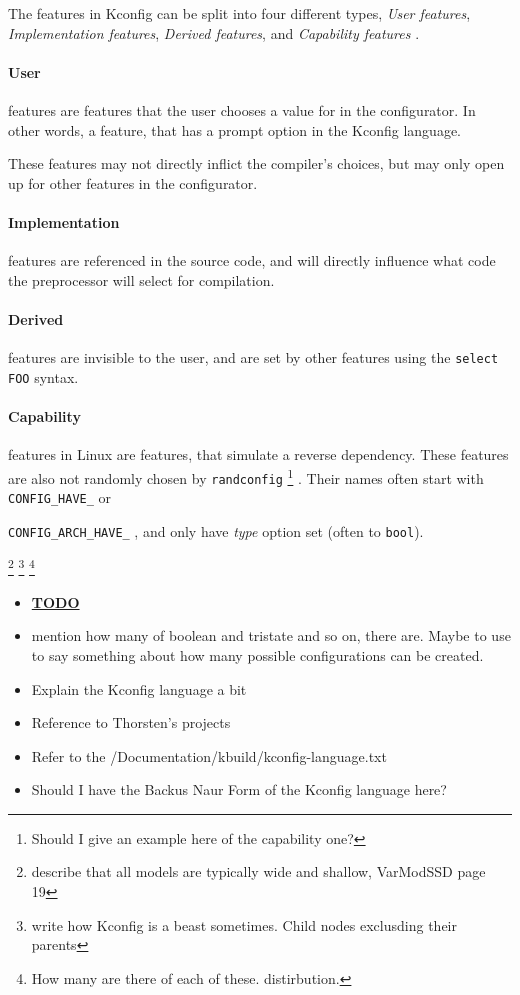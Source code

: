 \documentclass[a4paper,11pt]{report}
\newcommand{\textcode}[1]{
    \fboxsep=1pt
    \texttt{\colorbox{gray!20}{#1}}
}
\begin{document}
        {\color{gray}
The features in Kconfig can be split into four different types, \emph{User 
features}, \emph{Implementation features}, \emph{Derived features}, and 
\emph{Capability features}
    \cite[p. 8]{VarModSSD}
.
\\ 

\paragraph{User} features are features that the user chooses a value for in the 
configurator. In other words, a feature, that has a prompt option in the 
Kconfig language. 

These features may not directly inflict the compiler's choices, but may only 
open up for other features in the configurator.

\paragraph{Implementation} features are referenced in the source code, and will 
directly influence what code the preprocessor will select for compilation.

\paragraph{Derived} features are invisible to the user, and are set by other 
features using the \textcode{select FOO} syntax.

\paragraph{Capability} features in Linux are features, that simulate a reverse 
dependency. These features are also not randomly chosen by 
\texttt{randconfig}
    \footnote{Should I give an example here of the capability one?}
. Their names often start with \textcode{CONFIG\_HAVE\_} or 
\textcode{CONFIG\_ARCH\_HAVE\_}, and only have \emph{type} option set (often to 
\texttt{bool}).
        } %

    \footnote{describe that all models are typically wide and shallow, VarModSSD page 19}
    \footnote{write how Kconfig is a beast sometimes. Child nodes exclusding their parents}
    \footnote{How many are there of each of these. distirbution.}



\begin{itemize}
    \item \underline{\textbf{TODO}}
    \item mention how many of boolean and tristate and so on, there are. Maybe 
            to use to say something about how many possible configurations can 
            be created.
    \item Explain the Kconfig language a bit
    \item Reference to Thorsten's projects
    \item Refer to the /Documentation/kbuild/kconfig-language.txt
    \item Should I have the Backus Naur Form of the Kconfig language here?
\end{itemize}
\end{document}
